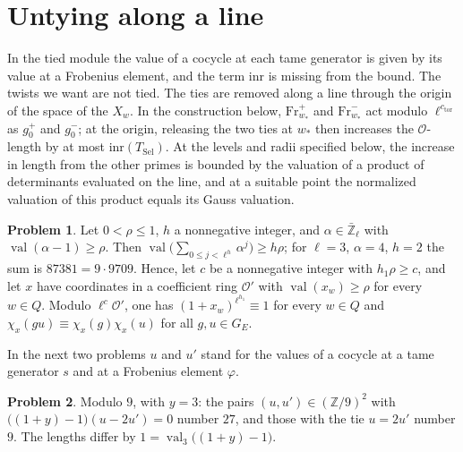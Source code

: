 \documentclass[reqno]{amsart}
\theoremstyle{definition}
\newtheorem{problem}{Problem}[section]
\theoremstyle{plain}
\newcommand{\Z}{\mathbb{Z}}
\newcommand{\Zl}{\bar{\mathbb{Z}}_\ell}
\newcommand{\val}{\operatorname{val}}
\newcommand{\Oc}{\mathcal{O}}
\newcommand{\TS}{T_{\mathrm{Sel}}}
\newcommand{\ctor}{c_{\mathrm{tor}}}
\newcommand{\Fr}{\mathrm{Fr}}
\begin{document}
\section{Untying along a line}\label{sec:line}

In the tied module the value of a cocycle at each tame generator is given by its value at a Frobenius element, and the term \(\mathrm{inr}\) is missing from the bound.  The twists we want are not tied.  The ties are removed along a line through the origin of the space of the \(X_w\).  In the construction below, \(\Fr_{w_*}^{+}\) and \(\Fr_{w_*}^{-}\) act modulo \(\ell^{\ctor}\) as \(g_0^{+}\) and \(g_0^{-}\); at the origin, releasing the two ties at \(w_*\) then increases the \(\Oc\)-length by at most \(\mathrm{inr}(\TS)\).  At the levels and radii specified below, the increase in length from the other primes is bounded by the valuation of a product of determinants evaluated on the line, and at a suitable point the normalized valuation of this product equals its Gauss valuation.

\begin{problem}\label{pr:geometric}
Let \(0 < \rho \le 1\), \(h\) a nonnegative integer, and \(\alpha \in \Zl\) with \(\val(\alpha - 1) \ge \rho\).  Then \(\val\bigl(\sum_{0 \le j < \ell^{h}} \alpha^j\bigr) \ge h\rho\); for \(\ell = 3\), \(\alpha = 4\), \(h = 2\) the sum is \(87381 = 9 \cdot 9709\).  Hence, let \(c\) be a nonnegative integer with \(h_1\rho \ge c\), and let \(x\) have coordinates in a coefficient ring \(\Oc'\) with \(\val(x_w) \ge \rho\) for every \(w \in Q\).  Modulo \(\ell^c\Oc'\), one has \((1 + x_w)^{\ell^{h_1}} \equiv 1\) for every \(w \in Q\) and \(\chi_x(gu) \equiv \chi_x(g)\chi_x(u)\) for all \(g, u \in G_E\).
\end{problem}

In the next two problems \(u\) and \(u'\) stand for the values of a cocycle at a tame generator \(s\) and at a Frobenius element \(\varphi\).

\begin{problem}\label{pr:line-rank-one}
Modulo \(9\), with \(y = 3\): the pairs \((u, u') \in (\Z/9)^2\) with \(\bigl((1 + y) - 1\bigr)(u - 2u') = 0\) number \(27\), and those with the tie \(u = 2u'\) number \(9\).  The lengths differ by \(1 = \val_3\bigl((1 + y) - 1\bigr)\).
\end{problem}
\end{document}
